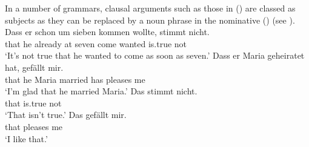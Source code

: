 {\noindent
In a number of grammars, clausal arguments such as those in () are classed as subjects as they can be replaced
by a noun phrase in the nominative () (see \eg \citealp[, 289]{Eisenberg2004a}).
\eal
\ex
\gll Dass er schon um sieben kommen wollte, stimmt nicht.\\
	 that he already at seven come wanted is.true not\\
\glt `It's not true that he wanted to come as soon as seven.'
\ex 
\gll Dass er Maria geheiratet hat, gefällt mir.\\
	 that he Maria married has pleases me\\
\glt `I'm glad that he married Maria.'
\zl
\eal
\ex
\gll Das stimmt nicht.\\
	 that is.true not\\
\glt `That isn't true.'
\ex 
\gll Das gefällt mir.\\
	 that pleases me\\
\glt `I like that.'
\zl
}

